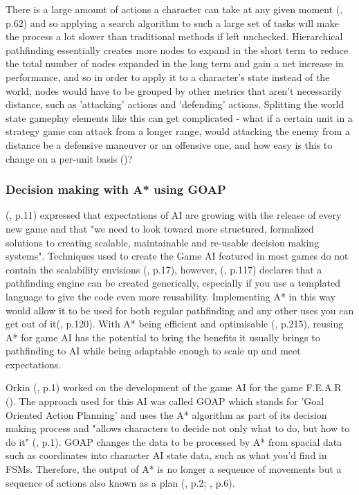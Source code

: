 \documentclass[11pt, a4paper]{article}
\begin{document}
There is a large amount of actions a character can take at any given moment (\cite{nareyek2004ai}, p.62) and so applying a search algorithm to such a large set of tasks will make the process a lot slower than traditional methods if left unchecked. Hierarchical pathfinding essentially creates more nodes to expand in the short term to reduce the total number of nodes expanded in the long term and gain a net increase in performance, and so in order to apply it to a character's state instead of the world, nodes would have to be grouped by other metrics that aren't necessarily distance, such as 'attacking' actions and 'defending' actions. Splitting the world state gameplay elements like this can get complicated - what if a certain unit in a strategy game can attack from a longer range, would attacking the enemy from a distance be a defensive maneuver or an offensive one, and how easy is this to change on a per-unit basis (\cite{weber2011building})?

\subsubsection{Decision making with A* using GOAP}

\citeauthor{orkin2003applying} (\citeyear{orkin2003applying}, p.11) expressed that expectations of AI are growing with the release of every new game and that "we need to look toward more structured, formalized solutions to creating scalable, maintainable and re-usable decision making systems". Techniques used to create the Game AI featured in most games do not contain the scalability \citeauthor{orkin2003applying} envisions (\cite{laird2001human}, p.17), however, \citeauthor{higgins2002generic} (\citeyear{higgins2002generic}, p.117) declares that a pathfinding engine can be created generically, especially if you use a templated language to give the code even more reusability. Implementing A* in this way would allow it to be used for both regular pathfinding and any other uses you can get out of it(\cite{higgins2002generic}, p.120). With A* being efficient and optimisable (\cite{millington2019ai}, p.215), reusing A* for game AI has the potential to bring the benefits it usually brings to pathfinding to AI while being adaptable enough to scale up and meet expectations.

Orkin (\citeyear{orkin2006three}, p.1) worked on the development of the game AI for the game F.E.A.R (\cite{FEAR}). The approach used for this AI was called GOAP which stands for 'Goal Oriented Action Planning' and uses the A* algorithm as part of its decision making process and "allows characters to decide not only what to do, but how to do it" (\cite{orkin2003applying}, p.1). GOAP changes the data to be processed by A* from spacial data such as coordinates into character AI state data, such as what you'd find in FSMs. Therefore, the output of A* is no longer a sequence of movements but a sequence of actions also known as a plan (\cite{orkin2003applying}, p.2; \cite{tozour2002evolution}, p.6).
\end{document}

